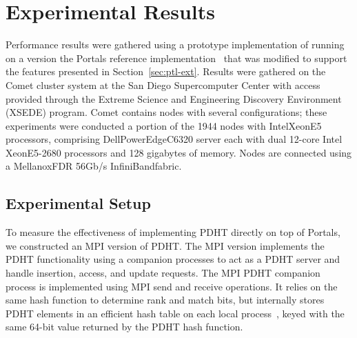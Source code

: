 \section{Experimental Results}




Performance results were gathered using a prototype implementation of \pdht
running on a version the Portals reference
implementation~\cite{portals-code} that was modified to support the features
presented in Section~\ref{sec:ptl-ext}. Results were gathered on the Comet
cluster
system at the San Diego Supercomputer Center with access provided through the
Extreme Science and Engineering Discovery Environment (XSEDE) program. Comet
contains nodes with several configurations; these experiments were conducted a
portion of the 1944 nodes with Intel\regtm Xeon\regtm E5 processors, comprising
Dell\othertm PowerEdge\othertm C6320 server each with dual 12-core Intel\regtm
Xeon\regtm E5-2680 processors and 128 gigabytes of memory. Nodes are connected
using a Mellanox\othertm FDR 56Gb/s InfiniBand\othertm fabric.

\subsection{Experimental Setup}

To measure the effectiveness of implementing PDHT directly on top of Portals,
we constructed an MPI version of PDHT. The MPI version implements the PDHT
functionality using a companion processes to act as a PDHT server and handle
insertion, access, and update requests.  The MPI PDHT companion process is
implemented using MPI send and receive operations.  It relies on the same hash
function to determine rank and match bits, but internally stores PDHT elements
in an efficient hash table on each local process~\cite{uthash}, keyed with the
same 64-bit value returned by the PDHT hash function. 

